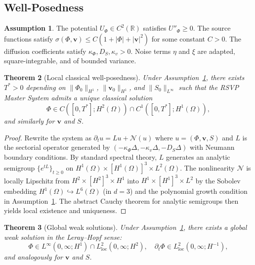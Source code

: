 \documentclass[12pt, a4paper]{article}
\theoremstyle{plain}
\newtheorem{theorem}{Theorem}[section]
\theoremstyle{definition}
\newtheorem{assumption}[theorem]{Assumption}
\theoremstyle{remark}
\newcommand{\vfield}{\mathbf{v}}
\begin{document}
\subsection{Well-Posedness}

\begin{assumption}
\label{ass:regularity}
The potential $U_\Phi \in C^2(\mathbb{R})$ satisfies $U''_\Phi \geq 0$.  The source functions
satisfy $\sigma(\Phi,\vfield) \leq C(1 + |\Phi| + |\vfield|^2)$ for some constant $C > 0$.
The diffusion coefficients satisfy $\kappa_\Phi, D_S, \kappa_v > 0$.  Noise terms $\eta$
and $\xi$ are adapted, square-integrable, and of bounded variance.
\end{assumption}

\begin{theorem}[Local classical well-posedness]
\label{thm:local}
Under Assumption~\ref{ass:regularity}, there exists $T^* > 0$ depending on
$\|\Phi_0\|_{H^1}$, $\|\vfield_0\|_{H^1}$, and $\|S_0\|_{L^\infty}$ such that the RSVP
Master System admits a unique classical solution
\[
\Phi \in C([0,T^*]; H^2(\Omega)) \cap C^1([0,T^*]; H^1(\Omega)),
\]
and similarly for $\vfield$ and $S$.
\end{theorem}

\begin{proof}
Rewrite the system as $\partial_t u = Lu + \mathcal{N}(u)$ where $u = (\Phi, \vfield, S)$
and $L$ is the sectorial operator generated by $(-\kappa_\Phi\Delta, -\kappa_v\Delta, -D_S\Delta)$
with Neumann boundary conditions.  By standard spectral theory, $L$ generates an analytic
semigroup $\{e^{tL}\}_{t\geq 0}$ on $H^1(\Omega)\times [H^1(\Omega)]^3 \times L^2(\Omega)$.
The nonlinearity $\mathcal{N}$ is locally Lipschitz from $H^2\times[H^2]^3\times H^1$ into
$H^1\times[H^1]^3\times L^2$ by the Sobolev embedding $H^1(\Omega)\hookrightarrow L^6(\Omega)$
(in $d = 3$) and the polynomial growth condition in Assumption~\ref{ass:regularity}.
The abstract Cauchy theorem for analytic semigroups \cite{Pazy1983} then yields local existence
and uniqueness.
\end{proof}

\begin{theorem}[Global weak solutions]
\label{thm:global}
Under Assumption~\ref{ass:regularity}, there exists a global weak solution in the
Leray--Hopf sense:
\[
\Phi \in L^\infty(0,\infty; H^1) \cap L^2_{\mathrm{loc}}(0,\infty; H^2),
\quad
\partial_t\Phi \in L^2_{\mathrm{loc}}(0,\infty; H^{-1}),
\]
and analogously for $\vfield$ and $S$.
\end{theorem}
\end{document}
